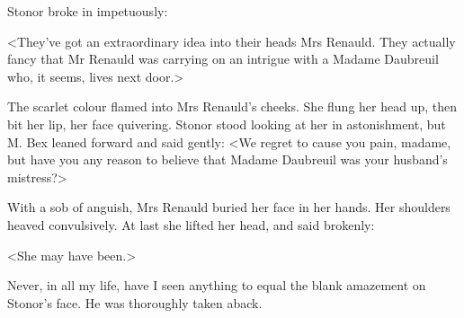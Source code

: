  Stonor broke in impetuously: 

 <They've got an extraordinary idea into their heads Mrs Renauld. They actually fancy that Mr Renauld was carrying on an intrigue with a Madame Daubreuil who, it seems, lives next door.> 

 The scarlet colour flamed into Mrs Renauld's cheeks. She flung her head up, then bit her lip, her face quivering. Stonor stood looking at her in astonishment, but M. Bex leaned forward and said gently: <We regret to cause you pain, madame, but have you any reason to believe that Madame Daubreuil was your husband's mistress?> 

 With a sob of anguish, Mrs Renauld buried her face in her hands. Her shoulders heaved convulsively. At last she lifted her head, and said brokenly: 

 <She may have been.> 

 Never, in all my life, have I seen anything to equal the blank amazement on Stonor's face. He was thoroughly taken aback.